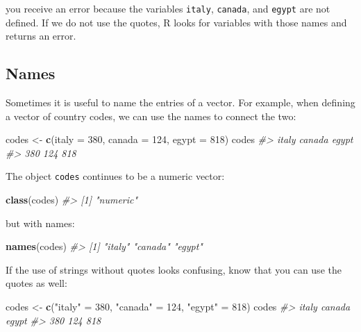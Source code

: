 \documentclass[
]{krantz}
\newenvironment{Shaded}{\begin{snugshade}}{\end{snugshade}}
\newcommand{\CommentTok}[1]{\textcolor[rgb]{0.37,0.37,0.37}{\textit{#1}}}
\newcommand{\DataTypeTok}[1]{\textcolor[rgb]{0.27,0.27,0.27}{#1}}
\newcommand{\DecValTok}[1]{\textcolor[rgb]{0.06,0.06,0.06}{#1}}
\newcommand{\KeywordTok}[1]{\textcolor[rgb]{0.27,0.27,0.27}{\textbf{#1}}}
\newcommand{\NormalTok}[1]{#1}
\newcommand{\StringTok}[1]{\textcolor[rgb]{0.5,0.5,0.5}{#1}}
\begin{document}
you receive an error because the variables \texttt{italy}, \texttt{canada}, and \texttt{egypt} are not defined. If we do not use the quotes, R looks for variables with those names and returns an error.

\hypertarget{names}{%
\subsection{Names}\label{names}}

Sometimes it is useful to name the entries of a vector. For example, when defining a vector of country codes, we can use the names to connect the two:

\begin{Shaded}
\begin{Highlighting}[]
\NormalTok{codes <-}\StringTok{ }\KeywordTok{c}\NormalTok{(}\DataTypeTok{italy =} \DecValTok{380}\NormalTok{, }\DataTypeTok{canada =} \DecValTok{124}\NormalTok{, }\DataTypeTok{egypt =} \DecValTok{818}\NormalTok{)}
\NormalTok{codes}
\CommentTok{#>  italy canada  egypt }
\CommentTok{#>    380    124    818}
\end{Highlighting}
\end{Shaded}

The object \texttt{codes} continues to be a numeric vector:

\begin{Shaded}
\begin{Highlighting}[]
\KeywordTok{class}\NormalTok{(codes)}
\CommentTok{#> [1] "numeric"}
\end{Highlighting}
\end{Shaded}

but with names:

\begin{Shaded}
\begin{Highlighting}[]
\KeywordTok{names}\NormalTok{(codes)}
\CommentTok{#> [1] "italy"  "canada" "egypt"}
\end{Highlighting}
\end{Shaded}

If the use of strings without quotes looks confusing, know that you can use the quotes as well:

\begin{Shaded}
\begin{Highlighting}[]
\NormalTok{codes <-}\StringTok{ }\KeywordTok{c}\NormalTok{(}\StringTok{"italy"}\NormalTok{ =}\StringTok{ }\DecValTok{380}\NormalTok{, }\StringTok{"canada"}\NormalTok{ =}\StringTok{ }\DecValTok{124}\NormalTok{, }\StringTok{"egypt"}\NormalTok{ =}\StringTok{ }\DecValTok{818}\NormalTok{)}
\NormalTok{codes}
\CommentTok{#>  italy canada  egypt }
\CommentTok{#>    380    124    818}
\end{Highlighting}
\end{Shaded}
\end{document}
